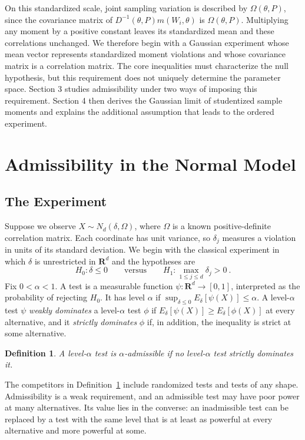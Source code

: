 \documentclass[11pt]{article}
\numberwithin{equation}{section}
\newtheorem{definition}{Definition}
\theoremstyle{definition}
\begin{document}
On this standardized scale, joint sampling variation is described by $\Omega(\theta,P)$, since the covariance matrix of $D^{-1}(\theta,P)m(W_i,\theta)$ is $\Omega(\theta,P)$. Multiplying any moment by a positive constant leaves its standardized mean and these correlations unchanged. We therefore begin with a Gaussian experiment whose mean vector represents standardized moment violations and whose covariance matrix is a correlation matrix. The core inequalities must characterize the null hypothesis, but this requirement does not uniquely determine the parameter space. Section 3 studies admissibility under two ways of imposing this requirement. Section 4 then derives the Gaussian limit of studentized sample moments and explains the additional assumption that leads to the ordered experiment.

\section{Admissibility in the Normal Model}\label{sec:normal}

\subsection{The Experiment}\label{sec:experiment}

Suppose we observe $X\sim N_d(\delta,\Omega)$, where $\Omega$ is a known positive-definite correlation matrix. Each coordinate has unit variance, so $\delta_j$ measures a violation in units of its standard deviation. We begin with the classical experiment in which $\delta$ is unrestricted in $\mathbf R^d$ and the hypotheses are
\[
H_0:\delta\le0
\qquad\text{versus}\qquad
H_1:\max_{1\le j\le d}\delta_j>0~.
\]
Fix $0<\alpha<1$. A test is a measurable function $\psi:\mathbf R^d\to[0,1]$, interpreted as the probability of rejecting $H_0$. It has level $\alpha$ if $\sup_{\delta\le0}E_\delta[\psi(X)]\le\alpha$. A level-$\alpha$ test $\psi$ \emph{weakly dominates} a level-$\alpha$ test $\phi$ if $E_\delta[\psi(X)]\ge E_\delta[\phi(X)]$ at every alternative, and it \emph{strictly dominates} $\phi$ if, in addition, the inequality is strict at some alternative.


\begin{definition}\label{def:admissible}
A level-$\alpha$ test is \emph{$\alpha$-admissible} if no level-$\alpha$ test strictly dominates it.
\end{definition}

The competitors in Definition~\ref{def:admissible} include randomized tests and tests of any shape. Admissibility is a weak requirement, and an admissible test may have poor power at many alternatives. Its value lies in the converse: an inadmissible test can be replaced by a test with the same level that is at least as powerful at every alternative and more powerful at some.
\end{document}
